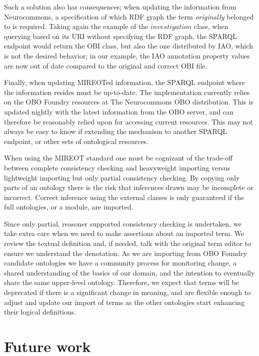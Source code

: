 \documentclass{ao2e}%
\begin{document}
Such a solution also has consequences; when updating the information from Neurocommons, a specification of which \ac{RDF} graph \cite{RDF} the term \emph{originally} belonged to is required. Taking again the example of the $investigation$ class, when querying based on its URI without specifying the RDF graph, the SPARQL endpoint would return the \ac{OBI} class, but also the one distributed by \ac{IAO}, which is not the desired behavior; in our example, the \ac{IAO} annotation property values are now out of date compared to the original and correct \ac{OBI} file.

Finally, when updating MIREOTed information, the SPARQL endpoint where the information resides must be up-to-date. The implementation currently relies on the \ac{OBO} Foundry resources at The Neurocommons \ac{OBO} distribution. This is updated nightly with the latest information from the \ac{OBO} server, and can therefore be reasonably relied upon for accessing current resources. This may not always be easy to know if extending the mechanism to another SPARQL endpoint, or other sets of ontological resources.

When using the \ac{MIREOT} standard one must be cognizant of the trade-off between complete consistency checking and heavyweight importing versus lightweight importing but only partial consistency checking.
By copying only parts of an ontology there is the risk that inferences drawn may be incomplete or incorrect. 
Correct inference using the external classes is only guaranteed if the full ontologies, or a module, are imported.

Since only partial, reasoner supported consistency checking is undertaken, we take extra care when we need to make assertions about an imported term. %
We review the textual definition and, if needed, talk with the original term editor to ensure we understand the denotation.
As we are importing from \ac{OBO} Foundry candidate ontologies we have a community process for monitoring change, a shared understanding of the basics of our domain, and the intention to eventually share the same upper-level ontology. 
Therefore, we expect that terms will be deprecated if there is a significant change in meaning, and are flexible enough to adjust and update our import of terms as the other ontologies start enhancing their logical definitions.


\section*{Future work}
\end{document}
